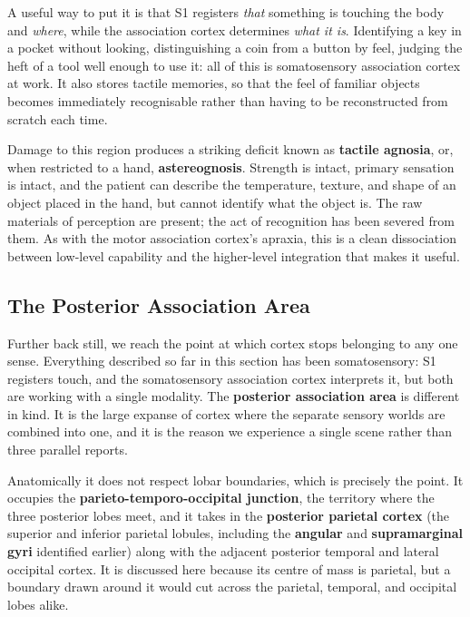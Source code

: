 \documentclass[11pt]{article}
\begin{document}
A useful way to put it is that S1 registers \textit{that} something is touching the body and \textit{where}, while the association cortex determines \textit{what it is}. Identifying a key in a pocket without looking, distinguishing a coin from a button by feel, judging the heft of a tool well enough to use it: all of this is somatosensory association cortex at work. It also stores tactile memories, so that the feel of familiar objects becomes immediately recognisable rather than having to be reconstructed from scratch each time.

Damage to this region produces a striking deficit known as \textbf{tactile agnosia}, or, when restricted to a hand, \textbf{astereognosis}. Strength is intact, primary sensation is intact, and the patient can describe the temperature, texture, and shape of an object placed in the hand, but cannot identify what the object is. The raw materials of perception are present; the act of recognition has been severed from them. As with the motor association cortex's apraxia, this is a clean dissociation between low-level capability and the higher-level integration that makes it useful.

\subsection{The Posterior Association Area}

Further back still, we reach the point at which cortex stops belonging to any one sense. Everything described so far in this section has been somatosensory: S1 registers touch, and the somatosensory association cortex interprets it, but both are working with a single modality. The \textbf{posterior association area} is different in kind. It is the large expanse of cortex where the separate sensory worlds are combined into one, and it is the reason we experience a single scene rather than three parallel reports.

Anatomically it does not respect lobar boundaries, which is precisely the point. It occupies the \textbf{parieto-temporo-occipital junction}, the territory where the three posterior lobes meet, and it takes in the \textbf{posterior parietal cortex} (the superior and inferior parietal lobules, including the \textbf{angular} and \textbf{supramarginal gyri} identified earlier) along with the adjacent posterior temporal and lateral occipital cortex. It is discussed here because its centre of mass is parietal, but a boundary drawn around it would cut across the parietal, temporal, and occipital lobes alike.
\end{document}
